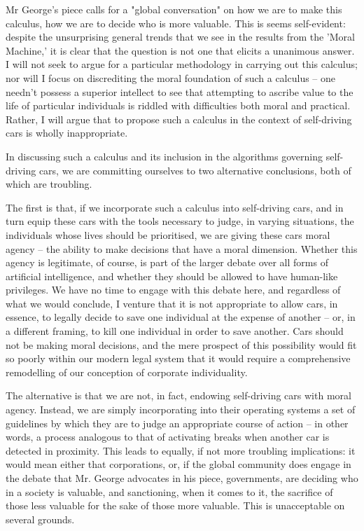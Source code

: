    Mr George's piece calls for a "global conversation" on how we are to
   make this calculus, how we are to decide who is more valuable. This is
   seems self-evident: despite the unsurprising general trends that we see
   in the results from the 'Moral Machine,' it is clear that the question
   is not one that elicits a unanimous answer. I will not seek to argue
   for a particular methodology in carrying out this calculus; nor will I
   focus on discrediting the moral foundation of such a calculus -- one
   needn't possess a superior intellect to see that attempting to ascribe
   value to the life of particular individuals is riddled with
   difficulties both moral and practical. Rather, I will argue that to
   propose such a calculus in the context of self-driving cars is wholly
   inappropriate.

   In discussing such a calculus and its inclusion in the algorithms
   governing self-driving cars, we are committing ourselves to two
   alternative conclusions, both of which are troubling.

   The first is that, if we incorporate such a calculus into self-driving
   cars, and in turn equip these cars with the tools necessary to judge,
   in varying situations, the individuals whose lives should be
   prioritised, we are giving these cars moral agency -- the ability to
   make decisions that have a moral dimension. Whether this agency is
   legitimate, of course, is part of the larger debate over all forms of
   artificial intelligence, and whether they should be allowed to have
   human-like privileges. We have no time to engage with this debate here,
   and regardless of what we would conclude, I venture that it is not
   appropriate to allow cars, in essence, to legally decide to save one
   individual at the expense of another -- or, in a different framing, to
   kill one individual in order to save another. Cars should not be making
   moral decisions, and the mere prospect of this possibility would fit so
   poorly within our modern legal system that it would require a
   comprehensive remodelling of our conception of corporate
   individuality.

   The alternative is that we are not, in fact, endowing self-driving cars
   with moral agency. Instead, we are simply incorporating into their
   operating systems a set of guidelines by which they are to judge an
   appropriate course of action -- in other words, a process analogous to
   that of activating breaks when another car is detected in proximity.
   This leads to equally, if not more troubling implications: it would
   mean either that corporations, or, if the global community does engage
   in the debate that Mr. George advocates in his piece, governments, are
   deciding who in a society is valuable, and sanctioning, when it comes
   to it, the sacrifice of those less valuable for the sake of those more
   valuable. This is unacceptable on several grounds.

